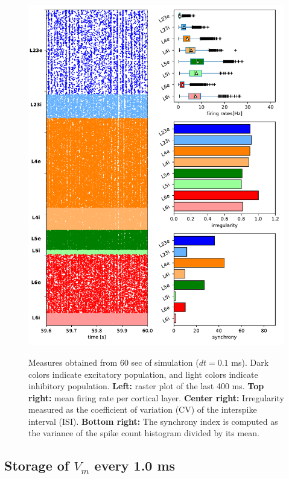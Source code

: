 \documentclass[11pt]{scrartcl}
\begin{document}
\begin{figure}
{    \includegraphics[width=0.5\linewidth]{figures/dGLPD_delta_1.pdf}
    \label{fig:measure_GLPD_1}
  }
    \caption{Measures obtained from 60 sec of simulation ($dt=0.1$ ms). Dark colors indicate excitatory population, and light colors indicate inhibitory population. \textbf{Left:} raster plot of the last 400 ms. \textbf{Top right:} mean firing rate per cortical layer. \textbf{Center right:} Irregularity measured as the coefficient of variation (CV) of the interspike interval (ISI). \textbf{Bottom right:} The synchrony index is computed as the variance of the spike count histogram divided by its mean.}
    \label{fig:measure_60}
\end{figure}


\subsection{Storage of \(V_m\) every 1.0 ms}
\label{sec:orgeefd06f}
\end{document}
